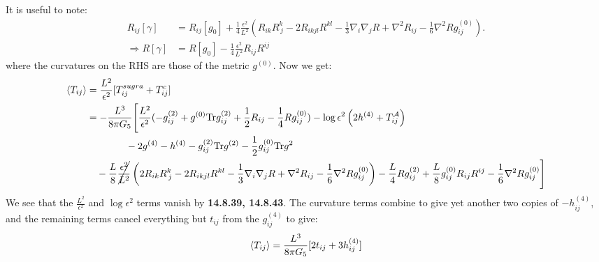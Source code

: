 \documentclass[11pt, class=article, crop=false]{standalone}
\begin{document}
\begin{enumerate}
	It is useful to note:
	\[
	\begin{aligned}
		R_{ij}[\gamma] &= R_{ij} [g_0] + \frac14 \frac{\epsilon^2}{L^2} \left(R_{ik} R^{k}_{\, j} - 2 R_{ikjl}  R^{kl} - \frac13 \nabla_i \nabla_j R + \nabla^2 R_{ij} - \frac16 \nabla^2 R g_{ij}^{(0)}\right).\\
		\Rightarrow R[\gamma] &= R[g_0] - \frac14 \frac{\epsilon^2}{L^2} R_{ij} R^{ij}
	\end{aligned}
	\]
	where the curvatures on the RHS are those of the metric $g^{(0)}$. Now we get:
	\[
	\begin{aligned}
		\braket{T_{ij}} &= \frac{L^2}{\epsilon^2} [T^{sugra}_{ij} + T^c_{ij}] \\
		&= -\frac{L^3}{8 \pi G_5} \Bigg[\frac{L^2}{\epsilon^2} (-g^{(2)}_{ij} + g^{(0)} \mathrm{Tr} g^{(2)}_{ij} + \frac12 R_{ij} - \frac14 R g_{ij}^{(0)}) - \log \epsilon^2 \left(2 h^{(4)} +  T^{\mathcal A}_{ij} \right)\\
		&\qquad \qquad -2 g^{(4)} - h^{(4)} - g_{ij}^{(2)} \mathrm{Tr} g^{(2)} - \frac12 g^{(0)}_{ij} \mathrm{Tr} g^2
		\\
		& \quad - \frac{L}{8} \cancel{\frac{\epsilon^2}{L^2}} \left(2 R_{ik} R^{k}_{\, j} - 2 R_{ikjl}  R^{kl} - \frac13 \nabla_i \nabla_j R + \nabla^2 R_{ij} - \frac16 \nabla^2 R g_{ij}^{(0)}\right) - \frac{L}{4} R g^{(2)}_{ij} + \frac{L}{8} g^{(0)}_{ij}  R_{ij} R^{ij} - \frac16 \nabla^2 R g^{(0)}_{ij}
		 \Bigg]
	\end{aligned}
	\]
	We see that the $\frac{L^2}{\epsilon^2}$ and $\log \epsilon^2$ terms vanish by \textbf{14.8.39, 14.8.43}. The curvature terms combine to give yet another two copies of $-h^{(4)}_{ij}$, and the remaining terms cancel everything but $t_{ij}$ from the $g^{(4)}_{ij}$ to give:
	\[
		\braket{T_{ij}} = \frac{L^3}{8 \pi G_5}[2 t_{ij} + 3 h^{(4)}_{ij}]
	\]
	

\end{enumerate}
\end{document}
